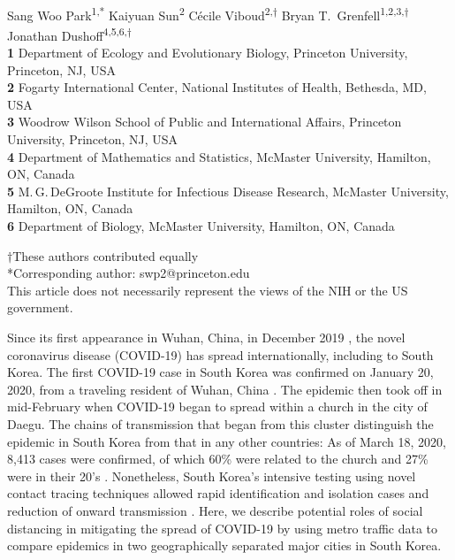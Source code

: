 \documentclass[12pt]{article}
\date{\today}
\begin{document}
\begin{flushleft}{
	\Large
	\textbf{}
}
\newline
\\
Sang Woo Park\textsuperscript{1,*}
Kaiyuan Sun\textsuperscript{2}
C\'ecile Viboud\textsuperscript{2,$\dagger$}
Bryan T.\ Grenfell\textsuperscript{1,2,3,$\dagger$}
Jonathan Dushoff\textsuperscript{4,5,6,$\dagger$}
\\
\bigskip
\textbf{1} Department of Ecology and Evolutionary Biology, Princeton University, Princeton, NJ, USA
\\
\textbf{2} Fogarty International Center, National Institutes of Health, Bethesda, MD, USA
\\
\textbf{3} Woodrow Wilson School of Public and International Affairs, Princeton University, Princeton, NJ, USA
\\
\textbf{4} Department of Mathematics and Statistics, McMaster University, Hamilton, ON, Canada
\\
\textbf{5} M.\,G.\,DeGroote Institute for Infectious Disease Research, McMaster University, Hamilton, ON, Canada
\\
\textbf{6} Department of Biology, McMaster University, Hamilton, ON, Canada
\\
\bigskip

$\dagger$These authors contributed equally\\
*Corresponding author: swp2@princeton.edu\\
This article does not necessarily represent the views of the NIH or the US government.
\end{flushleft}

\pagebreak

Since its first appearance in Wuhan, China, in December 2019 \citep{pneumonia}, the novel coronavirus disease (COVID-19) has spread internationally, including to South Korea.
The first COVID-19 case in South Korea was confirmed on January 20, 2020, from a traveling resident of Wuhan, China \citep{kcdc}.
The epidemic then took off in mid-February when COVID-19 began to spread within a church in the city of Daegu.
The chains of transmission that began from this cluster distinguish the epidemic in South Korea from that in any other countries:
As of March 18, 2020, 8,413 cases were confirmed, of which 60\% were related to the church and 27\% were in their 20's \citep{kcdc}.
Nonetheless, South Korea's intensive testing using novel contact tracing techniques allowed rapid identification and isolation cases and reduction of onward transmission \citep{fergusonimpact, tracingkorea, science}.
Here, we describe potential roles of social distancing in mitigating the spread of COVID-19 by using metro traffic data to compare epidemics in two geographically separated major cities in South Korea.
\end{document}
